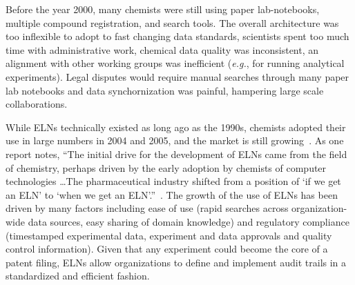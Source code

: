 \documentclass{sig-alternate}
\begin{document}
Before the year 2000, many chemists were still using paper
lab-notebooks, multiple compound registration, and search
tools. The overall architecture was too inflexible to
adopt to fast changing data standards, scientists spent too much time
with administrative work, chemical data quality was inconsistent, an
alignment with other working groups was inefficient (\emph{e.g.}, for
running analytical experiments). Legal disputes would require manual
searches through many paper lab notebooks and data synchornization was
painful, hampering large scale collaborations.


While ELNs technically existed as long ago as the 1990s, chemists
adopted their use in large numbers in 2004 and 2005, and the market is
still growing~\cite{ELNstatus}. As one report notes, ``The initial
drive for the development of ELNs came from the field of chemistry,
perhaps driven by the early adoption by chemists of computer
technologies \ldots The pharmaceutical industry shifted from a
position of `if we get an ELN' to `when we get an
ELN'.''~\cite{ELNstatus}. The growth of the use of ELNs has been
driven by many factors including ease of use (rapid searches across
organization-wide data sources, easy sharing of domain knowledge) and
regulatory compliance (timestamped experimental data, experiment and
data approvals and quality control information). Given that any experiment could
become the core of a patent filing, ELNs allow organizations to define
and implement audit trails in a standardized and efficient fashion.
\end{document}
